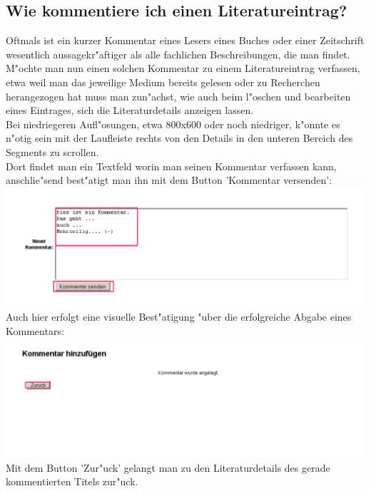 \subsection{Wie kommentiere ich einen Literatureintrag?}
Oftmals ist ein kurzer Kommentar eines Lesers eines Buches oder einer Zeitschrift wesentlich aussagekr"aftiger als alle fachlichen Beschreibungen, die man findet.\\
M"ochte man nun einen solchen Kommentar zu einem Literatureintrag verfassen, etwa weil man das jeweilige Medium bereits gelesen oder zu Recherchen herangezogen hat muss man zun"achst, wie auch beim l"oschen und bearbeiten eines Eintrages, sich die Literaturdetails anzeigen lassen.\\
Bei niedriegeren Aufl"osungen, etwa 800x600 oder noch niedriger, k"onnte es n"otig sein mit der Laufleiste rechts von den Details in den unteren Bereich des Segments zu scrollen.\\
Dort findet man ein Textfeld worin man seinen Kommentar verfassen kann, anschlie"send best"atigt man ihn mit dem Button 'Kommentar versenden':\\
\includegraphics[scale=0.8]{comment1}\\
Auch hier erfolgt eine visuelle Best"atigung "uber die erfolgreiche Abgabe eines Kommentars:
\includegraphics[scale=0.8]{comment2}\\
Mit dem Button 'Zur"uck' gelangt man zu den Literaturdetails des gerade kommentierten Titels zur"uck.

